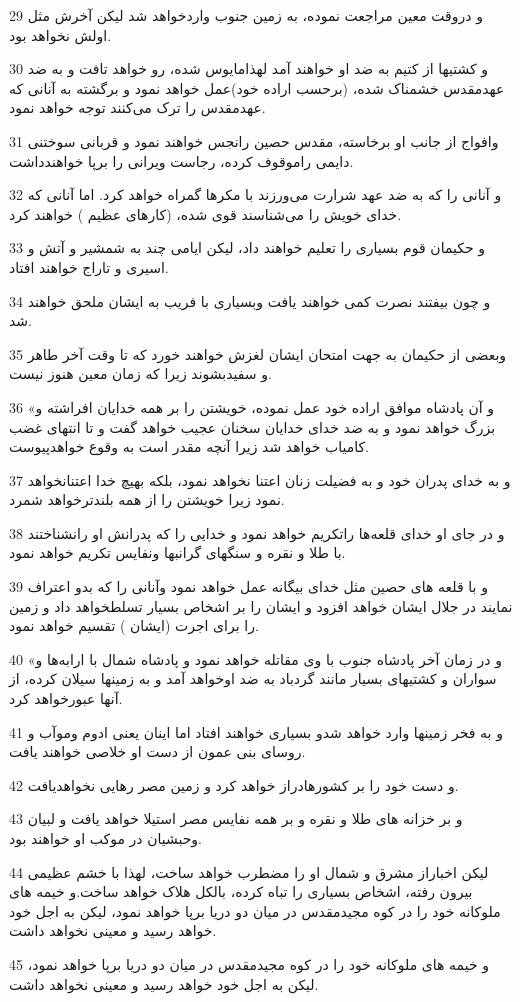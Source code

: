 \par 29 و دروقت معین مراجعت نموده، به زمین جنوب واردخواهد شد لیکن آخرش مثل اولش نخواهد بود.
\par 30 و کشتیها از کتیم به ضد او خواهند آمد لهذامایوس شده، رو خواهد تافت و به ضد عهدمقدس خشمناک شده، (برحسب اراده خود)عمل خواهد نمود و برگشته به آنانی که عهدمقدس را ترک می‌کنند توجه خواهد نمود.
\par 31 وافواج از جانب او برخاسته، مقدس حصین رانجس خواهند نمود و قربانی سوختنی دایمی راموقوف کرده، رجاست ویرانی را برپا خواهندداشت.
\par 32 و آنانی را که به ضد عهد شرارت می‌ورزند با مکرها گمراه خواهد کرد. اما آنانی که خدای خویش را می‌شناسند قوی شده، (کارهای عظیم ) خواهند کرد.
\par 33 و حکیمان قوم بسیاری را تعلیم خواهند داد، لیکن ایامی چند به شمشیر و آتش و اسیری و تاراج خواهند افتاد.
\par 34 و چون بیفتند نصرت کمی خواهند یافت وبسیاری با فریب به ایشان ملحق خواهند شد.
\par 35 وبعضی از حکیمان به جهت امتحان ایشان لغزش خواهند خورد که تا وقت آخر طاهر و سفیدبشوند زیرا که زمان معین هنوز نیست.
\par 36 «و آن پادشاه موافق اراده خود عمل نموده، خویشتن را بر همه خدایان افراشته و بزرگ خواهد نمود و به ضد خدای خدایان سخنان عجیب خواهد گفت و تا انتهای غضب کامیاب خواهد شد زیرا آنچه مقدر است به وقوع خواهدپیوست.
\par 37 و به خدای پدران خود و به فضیلت زنان اعتنا نخواهد نمود، بلکه بهیچ خدا اعتنانخواهد نمود زیرا خویشتن را از همه بلندترخواهد شمرد.
\par 38 و در جای او خدای قلعه‌ها راتکریم خواهد نمود و خدایی را که پدرانش او رانشناختند با طلا و نقره و سنگهای گرانبها ونفایس تکریم خواهد نمود.
\par 39 و با قلعه های حصین مثل خدای بیگانه عمل خواهد نمود وآنانی را که بدو اعتراف نمایند در جلال ایشان خواهد افزود و ایشان را بر اشخاص بسیار تسلطخواهد داد و زمین را برای اجرت (ایشان ) تقسیم خواهد نمود.
\par 40 «و در زمان آخر پادشاه جنوب با وی مقاتله خواهد نمود و پادشاه شمال با ارابه‌ها و سواران و کشتیهای بسیار مانند گردباد به ضد اوخواهد آمد و به زمینها سیلان کرده، از آنها عبورخواهد کرد.
\par 41 و به فخر زمینها وارد خواهد شدو بسیاری خواهند افتاد اما اینان یعنی ادوم وموآب و روسای بنی عمون از دست او خلاصی خواهند یافت.
\par 42 و دست خود را بر کشورهادراز خواهد کرد و زمین مصر رهایی نخواهدیافت.
\par 43 و بر خزانه های طلا و نقره و بر همه نفایس مصر استیلا خواهد یافت و لبیان وحبشیان در موکب او خواهند بود.
\par 44 لیکن اخباراز مشرق و شمال او را مضطرب خواهد ساخت، لهذا با خشم عظیمی بیرون رفته، اشخاص بسیاری را تباه کرده، بالکل هلاک خواهد ساخت.و خیمه های ملوکانه خود را در کوه مجیدمقدس در میان دو دریا برپا خواهد نمود، لیکن به اجل خود خواهد رسید و معینی نخواهد داشت.
\par 45 و خیمه های ملوکانه خود را در کوه مجیدمقدس در میان دو دریا برپا خواهد نمود، لیکن به اجل خود خواهد رسید و معینی نخواهد داشت.

